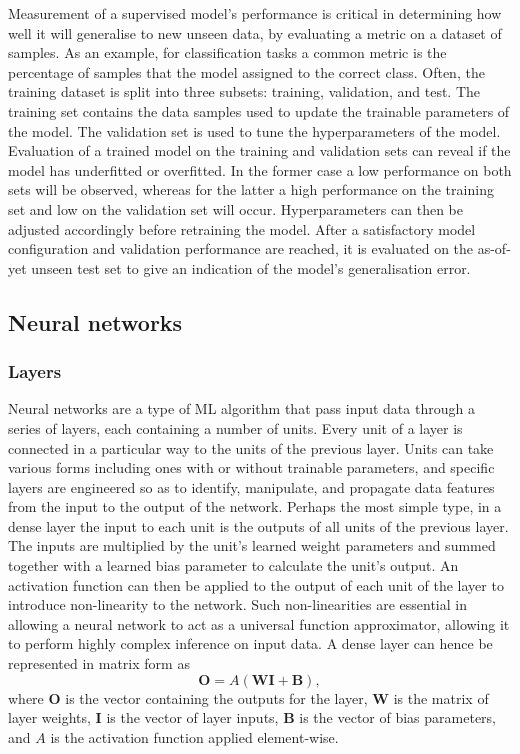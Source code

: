 \documentclass[12pt]{article}
\begin{document}
Measurement of a supervised model's performance is critical in determining how well it will generalise to new unseen data, by evaluating a metric on a dataset of samples. As an example, for classification tasks a common metric is the percentage of samples that the model assigned to the correct class. Often, the training dataset is split into three subsets: training, validation, and test. The training set contains the data samples used to update the trainable parameters of the model. The validation set is used to tune the hyperparameters of the model. Evaluation of a trained model on the training and validation sets can reveal if the model has underfitted or overfitted. In the former case a low performance on both sets will be observed, whereas for the latter a high performance on the training set and low on the validation set will occur. Hyperparameters can then be adjusted accordingly before retraining the model. After a satisfactory model configuration and validation performance are reached, it is evaluated on the as-of-yet unseen test set to give an indication of the model's generalisation error.

\subsection{Neural networks}
\subsubsection{Layers}
Neural networks are a type of ML algorithm that pass input data through a series of layers, each containing a number of units. Every unit of a layer is connected in a particular way to the units of the previous layer. Units can take various forms including ones with or without trainable parameters, and specific layers are engineered so as to identify, manipulate, and propagate data features from the input to the output of the network. Perhaps the most simple type, in a dense layer the input to each unit is the outputs of all units of the previous layer. The inputs are multiplied by the unit's learned weight parameters and summed together with a learned bias parameter to calculate the unit's output. An activation function can then be applied to the output of each unit of the layer to introduce non-linearity to the network. Such non-linearities are essential in allowing a neural network to act as a universal function approximator, allowing it to perform highly complex inference on input data. A dense layer can hence be represented in matrix form as
\begin{equation}
\bm{O}=A(\bm{W}\bm{I}+\bm{B}), \label{dense}
\end{equation}
where $\bm{O}$ is the vector containing the outputs for the layer, $\bm{W}$ is the matrix of layer weights, $\bm{I}$ is the vector of layer inputs, $\bm{B}$ is the vector of bias parameters, and $A$ is the activation function applied element-wise.
\end{document}
